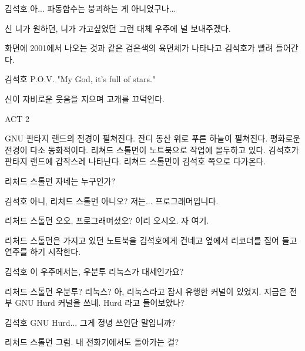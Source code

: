 \documentclass{screenplay}
\begin{document}
    
    \begin{dialogue}{김석호}
        아... 파동함수는 붕괴하는 게 아니었구나...
    \end{dialogue}
    
    \begin{dialogue}{신}
        니가 원하던, 니가 가고싶었던 그런 대체 우주에 널 보내주겠다.
    \end{dialogue}
    
    화면에 2001에서 나오는 것과 같은 검은색의 육면체가 나타나고 김석호가 빨려 들어간다.
    
    \begin{dialogue}{김석호}
        P.O.V. "My God, it's full of stars."
    \end{dialogue}
    
    신이 자비로운 웃음을 지으며 고개를 끄덕인다.
    
    \fadeout
    
    \pagebreak
    
    ACT 2
    
    \fadein
    
    
    GNU 판타지 랜드의 전경이 펼쳐진다. 잔디 동산 위로 푸른 하늘이 펼쳐진다. 평화로운 전경이 다소 동화적이다. 리쳐드 스톨먼이 노트북으로 작업에 몰두하고 있다. 김석호가 판타지 랜드에 갑작스레 나타난다. 리쳐드 스톨먼이 김석호 쪽으로 다가온다.
    
    \begin{dialogue}{리처드 스톨먼}
        자네는 누구인가?
    \end{dialogue}
    
    \begin{dialogue}{김석호}
        아니, 리처드 스톨먼 아니오? 저는... 프로그래머입니다.
    \end{dialogue}
    
    \begin{dialogue}{리처드 스톨먼}
        오오, 프로그래머셨오? 이리 오시오. 자 여기.
    \end{dialogue}
    
    리처드 스톨먼은 가지고 있던 노트북을 김석호에게 건네고 옆에서 리코더를 집어 들고 연주를 하기 시작한다.
    
    \begin{dialogue}[한참 이것 저것 살펴보다가]{김석호}
        이 우주에서는, 우분투 리눅스가 대세인가요?
    \end{dialogue}
    \begin{dialogue}{리처드 스톨먼}
        우분투? 리눅스?
        아, 리눅스라고 잠시 유행한 커널이 있었지. 지금은 전부 GNU Hurd 커널을 쓰네. Hurd 라고 들어보았나?
    \end{dialogue}
    \begin{dialogue}[감격해 하며]{김석호}
        GNU Hurd... 그게 정녕 쓰인단 말입니까?
    \end{dialogue}
    \begin{dialogue}{리처드 스톨먼}
        그럼. 내 전화기에서도 돌아가는 걸?
    \end{dialogue}
    
\end{document}
